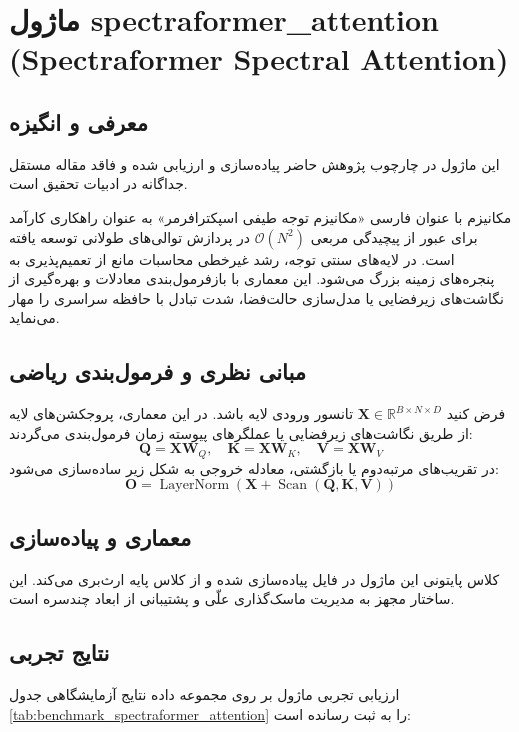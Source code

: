 \section{ماژول spectraformer\_attention (Spectraformer Spectral Attention)}
\label{sec:module_spectraformer_attention}

\subsection{معرفی و انگیزه}
این ماژول در چارچوب پژوهش حاضر پیاده‌سازی و ارزیابی شده و فاقد مقاله مستقل جداگانه در ادبیات تحقیق است.

مکانیزم  با عنوان فارسی «مکانیزم توجه طیفی اسپکترافرمر» به عنوان راهکاری کارآمد برای عبور از پیچیدگی مربعی $\mathcal{O}(N^2)$ در پردازش توالی‌های طولانی توسعه یافته است. در لایه‌های سنتی توجه، رشد غیرخطی محاسبات مانع از تعمیم‌پذیری به پنجره‌های زمینه بزرگ می‌شود. این معماری با بازفرمول‌بندی معادلات و بهره‌گیری از نگاشت‌های زیرفضایی یا مدل‌سازی حالت‌فضا، شدت تبادل با حافظه سراسری را مهار می‌نماید.

\subsection{مبانی نظری و فرمول‌بندی ریاضی}
فرض کنید $\mathbf{X} \in \mathbb{R}^{B \times N \times D}$ تانسور ورودی لایه باشد. در این معماری، پروجکشن‌های لایه از طریق نگاشت‌های زیرفضایی یا عملگرهای پیوسته زمان فرمول‌بندی می‌گردند:
 \begin{equation}
\mathbf{Q} = \mathbf{X} \mathbf{W}_Q, \quad \mathbf{K} = \mathbf{X} \mathbf{W}_K, \quad \mathbf{V} = \mathbf{X} \mathbf{W}_V
\end{equation}
در تقریب‌های مرتبه‌دوم یا بازگشتی، معادله خروجی به شکل زیر ساده‌سازی می‌شود:
 \begin{equation}
\mathbf{O} = \operatorname{LayerNorm}\left(\mathbf{X} + \operatorname{Scan}(\mathbf{Q}, \mathbf{K}, \mathbf{V})
\right)
\end{equation}

\subsection{معماری و پیاده‌سازی}
کلاس پایتونی این ماژول در فایل  پیاده‌سازی شده و از کلاس پایه  ارث‌بری می‌کند. این ساختار مجهز به مدیریت ماسک‌گذاری علّی و پشتیبانی از ابعاد چندسره است.

\subsection{نتایج تجربی}
ارزیابی تجربی ماژول  بر روی مجموعه داده  نتایج آزمایشگاهی جدول 
\ref{tab:benchmark_spectraformer_attention} را به ثبت رسانده است:


